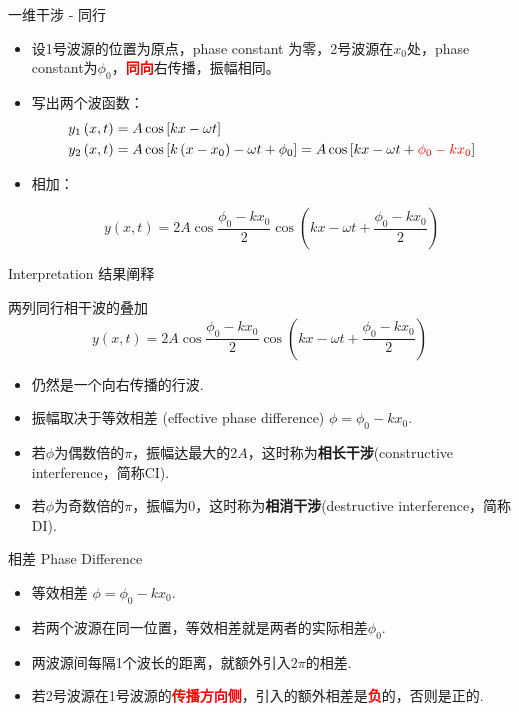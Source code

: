 \documentclass{beamer}
\begin{document}
\begin{frame}{一维干涉 - 同行}
	\begin{itemize}
		\item 设1号波源的位置为原点，phase constant 为零，2号波源在$x_0$处，phase constant为$\phi_0$，\textbf{\textcolor{red}{同向}}右传播，振幅相同。
		\item 写出两个波函数：
		\begin{align*}
			y_1\left(x, t\right) &= A \cos \left[kx - \omega t\right]\\
			y_2\left(x, t\right) &= A \cos \left[k\left(x - x_0\right) - \omega t + \phi_0 \right] = A \cos \left[kx - \omega t + \textcolor{red}{\phi_0 - kx_0}\right]
		\end{align*}
		
		\item 相加：
		
		\[y\left(x, t\right) = 2A \cos \frac{\phi_0 - kx_0}{2}\cos \left(kx -\omega t + \frac{\phi_0 - kx_0}{2}\right)\]
	\end{itemize}
\end{frame}

\begin{frame}{Interpretation 结果阐释}
	\begin{block}{两列同行相干波的叠加}
		\[y\left(x, t\right) = 2A \cos \frac{\phi_0 - kx_0}{2}\cos \left(kx -\omega t + \frac{\phi_0 - kx_0}{2}\right)\]
	\end{block}
	
	\begin{itemize}
		\item 仍然是一个向右传播的行波.
		\item 振幅取决于等效相差 (effective phase difference) $\phi = \phi_0 - kx_0$.
		\item 若$\phi$为偶数倍的$\pi$，振幅达最大的$2A$，这时称为\textbf{相长干涉}(constructive interference，简称CI).
		\item 若$\phi$为奇数倍的$\pi$，振幅为0，这时称为\textbf{相消干涉}(destructive interference，简称DI).
	\end{itemize}
\end{frame}

\begin{frame}{相差 Phase Difference}
	\begin{itemize}
		\item 等效相差 $\phi = \phi_0 - kx_0$.
		\item 若两个波源在同一位置，等效相差就是两者的实际相差$\phi_0$.
		\item 两波源间每隔1个波长的距离，就额外引入$2\pi$的相差.
		\item 若2号波源在1号波源的\textbf{\textcolor{red}{传播方向侧}}，引入的额外相差是\textbf{\textcolor{red}{负}}的，否则是正的.
	\end{itemize}
\end{frame}
\end{document}
